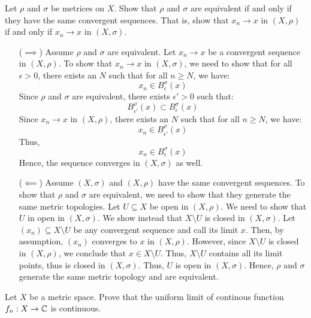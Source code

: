 \documentclass[12pt]{article}
\begin{document}
\begin{problem}{5}
    Let $\rho$ and $\sigma$ be metrices on $X$. Show that $\rho$ and $\sigma$ are equivalent if and only if they have the same convergent sequences. That is, show that $x_n \to x$ in $(X, \rho)$ if and only if $x_n \to x$ in $(X, \sigma)$.
\end{problem}

\begin{solution}
    \bbni
    \begin{itemize}
        \item[($\implies$)] Assume $\rho$ and $\sigma$ are equivalent. Let $x_n \to x$ be a convergent sequence in $(X, \rho)$. To show that $x_n \to x$ in $(X, \sigma)$, we need to show that for all $\epsilon > 0$, there exists an $N$ such that for all $n \geq N$, we have:
        \[ x_n \in B_\epsilon^\sigma(x) \]
        Since $\rho$ and $\sigma$ are equivalent, there exists $\epsilon' > 0$ such that: 
        \[ B_{\epsilon'}^\rho(x) \subset B_{\epsilon}^\sigma(x)\]
        Since $x_n \to x$ in $(X, \rho)$, there exists an $N$ such that for all $n \geq N$, we have:
        \[ x_n \in B_{\epsilon'}^\rho(x)\]
        Thus, 
        \[ x_n \in B_{\epsilon}^\sigma(x) \]
        Hence, the sequence converges in $(X, \sigma)$ as well.

        \item[($\impliedby$)] Assume $(X, \sigma)$ and $(X, \rho)$ have the same convergent sequences. To show that $\rho$ and $\sigma$ are equivalent, we need to show that they generate the same metric topologies. Let $U \subseteq X$ be open in $(X, \rho)$. We need to show that $U$ in open in $(X, \sigma)$. \bbni
        We show instead that $X \setminus U$ is closed in $(X, \sigma)$. Let $(x_n) \subseteq X \setminus U$ be any convergent sequence and call its limit $x$. Then, by assumption, $(x_n)$ converges to $x$ in $(X, \rho)$. However, since $X \setminus U$ is closed in $(X, \rho)$, we conclude that $x \in X \setminus U$. Thus, $X \setminus U$ contains all its limit points, thus is closed in $(X, \sigma)$. Thus, $U$ is open in $(X, \sigma)$. Hence, $\rho$ and $\sigma$ generate the same metric topology and are equivalent. 
    \end{itemize}
\end{solution}
\newpage 


\begin{problem}{6} 
    Let $X$ be a metric space. Prove that the uniform limit of continous function $f_n: X \to \mathbb C$ is continuous.
\end{problem}
\end{document}
